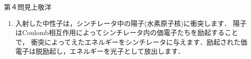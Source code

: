 \begin{answer}{第４問}{見上敬洋}
\begin{enumerate}
\begin{enumerate}
    重心系での座標を右のようにとることにすると，重心系での陽子の運動量は
    \begin{equation}
      -\sqrt{2mE^*}
      \begin{pmatrix}
        \cos\theta^* \\ \sin\theta^*
      \end{pmatrix}
      =-\frac 12 \sqrt{2mT}
      \begin{pmatrix}
        \cos\theta^* \\ \sin\theta^* 
      \end{pmatrix} \notag
    \end{equation}
    とかけます．これを実験室系に戻すには$x$方向に運動量$\dfrac 12 \sqrt{2mT}$だけ進めばよいから，
    \begin{equation}
      \bm{p}_L = 
      \frac 12 \sqrt{2mT} 
      \begin{pmatrix}
        1-\cos\theta^* \\ -\sin\theta^*
      \end{pmatrix} \notag
    \end{equation}
    が，実験室系での運動量となります．よって運動エネルギーは
    \begin{equation}
      E = \frac{\bm{p}_L^2}{2m} = \frac T2 \left( 1 - \cos\theta^*\right). \ilabel{4energy}
    \end{equation}

  \item
    式より，$dE = \dfrac T2 \sin\theta^* \,d\theta^*$となります．したがって，エネルギーが$E\sim E+dE$に入るような，各$\theta^*$の幅は
    \begin{equation}
      2\times d\theta^* = 2\times \frac{2 dE}{T\sin\theta^*} \notag
    \end{equation}
    です．2倍したのは，各$E$に対して$\pm\theta^*$の二つが対応するので，それぞれの幅を加えたからです．
    重心系で散乱は等方的という仮定より，$\theta^*$軸には確率密度$1/2\pi$が入ります．こうして，$E\sim E+dE$に入る確率は
    \begin{equation}
      \frac{dW}{dE} dE = \frac {4dE}{T\sin\theta^*} \Big/ {2\pi} , \quad \therefore \odif{W}{E} = \frac{1}{\pi\sqrt{E(T-E)}}\notag .
    \end{equation}

  \end{enumerate}

\item
  入射した中性子は，シンチレータ中の陽子(水素原子核)に衝突します．
  陽子はCoulomb相互作用によってシンチレータ内の価電子たちを励起することで，
  衝突によってえたエネルギーをシンチレータに与えます．励起された価電子は脱励起し，エネルギーを光子として放出します．


\end{enumerate}
\end{answer}
